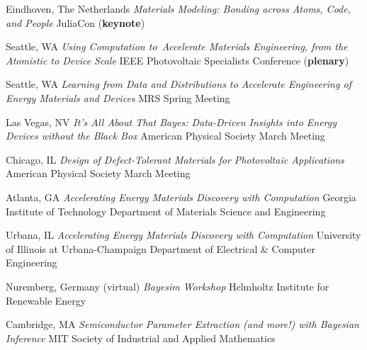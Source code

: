         {Eindhoven, The Netherlands}
        {\textit{Materials Modeling: Bonding across Atoms, Code, and People}}
        {JuliaCon (\textbf{keynote})}

\vspace{\talksep}
\datedsubsection{}
        {Seattle, WA}
        {\textit{Using Computation to Accelerate Materials Engineering, from the Atomistic to Device Scale}}
        {IEEE Photovoltaic Specialists Conference (\textbf{plenary})}

\vspace{\talksep}
\datedsubsection{}
        {Seattle, WA}
        {\textit{Learning from Data and Distributions to Accelerate Engineering of Energy Materials and Devices}}
        {MRS Spring Meeting}

\vspace{\talksep}
    {Las Vegas, NV}
    {\textit{It's All About That Bayes: Data-Driven Insights into Energy Devices without the Black Box}}
    {American Physical Society March Meeting}

\vspace{\talksep}
    {Chicago, IL}
    {\textit{Design of Defect-Tolerant Materials for Photovoltaic Applications}}
    {American Physical Society March Meeting}

\vspace{\talksep}
    {Atlanta, GA}
    {\textit{Accelerating Energy Materials Discovery with Computation}}
    {Georgia Institute of Technology Department of Materials Science and Engineering}

\vspace{\talksep}
\datedsubsection{}
    {Urbana, IL}
    {\textit{Accelerating Energy Materials Discovery with Computation}}
    {University of Illinois at Urbana-Champaign Department of Electrical \& Computer Engineering}

\vspace{\talksep}
    {Nuremberg, Germany (virtual)}
    {\textit{Bayesim Workshop}}
    {Helmholtz Institute for Renewable Energy}

\vspace{\talksep}
    {Cambridge, MA}
    {\textit{Semiconductor Parameter Extraction (and more!) with Bayesian Inference}}
    {MIT Society of Industrial and Applied Mathematics}
